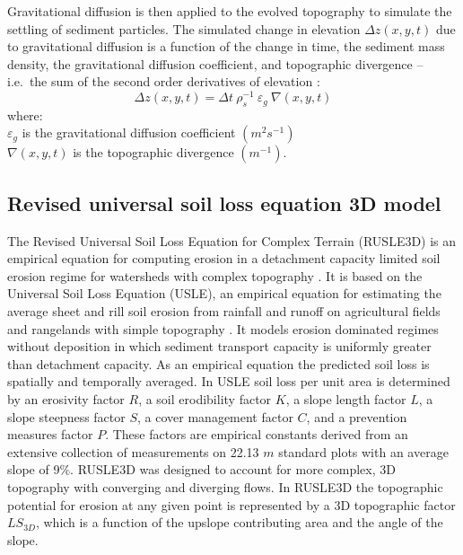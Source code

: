 \documentclass[esurf, manuscript]{copernicus}
\begin{document}
\noindent
Gravitational diffusion is then applied to the evolved topography
to simulate the settling of sediment particles. 
The simulated change in elevation $\Delta z(x,y,t) $ due to gravitational diffusion 
is a function of the change in time, the sediment mass density, 
the gravitational diffusion coefficient, and topographic divergence 
-- i.e.~the sum of the second order derivatives of elevation
\citep{thaxton2004}:
\begin{equation}
\label{eq:grav_diffusion} 
{\Delta z(x,y,t) = \Delta t ~ \rho_s^{-1} ~ \varepsilon_g ~ \nabla(x,y,t)}
\end{equation}
{\small
\noindent
where: \\
\noindent
\hspace*{0.5em} $\varepsilon_g$ is the gravitational diffusion coefficient $(m^{2} s^{-1})$\\ %
\hspace*{0.5em} $\nabla(x,y,t)$ is the topographic divergence $(m^{-1})$.\\
}

\subsection{Revised universal soil loss equation 3D model}
\label{rusle_model}
The Revised Universal Soil Loss Equation for Complex Terrain (RUSLE3D) 
is an empirical equation for computing erosion 
in a detachment capacity limited soil erosion regime
for watersheds with complex topography \citep{Mitasova1996}. 
It is based on 
the Universal Soil Loss Equation (USLE),
an empirical equation for estimating the average
sheet and rill soil erosion from rainfall and runoff
on agricultural fields and rangelands with simple topography 
\citep{Wischmeier1978}. 
It models erosion dominated regimes without deposition
in which sediment transport capacity is 
uniformly greater than detachment capacity.
As an empirical equation the predicted soil loss 
is spatially and temporally averaged. 
In USLE soil loss per unit area is determined by 
an erosivity factor $R$,
a soil erodibility factor $K$, 
a slope length factor $L$,
a slope steepness factor $S$,
a cover management factor $C$,
and a prevention measures factor $P$.
These factors are empirical constants derived 
from an extensive collection of measurements 
on 22.13 $m$ standard plots with an average slope of 9$\%$.  
RUSLE3D was designed to account for more complex, 3D topography 
with converging and diverging flows. 
In RUSLE3D the topographic potential for erosion at any given point 
is represented by a 3D topographic factor $LS_{3D}$,
which is a function of the upslope contributing area 
and the angle of the slope. 
\end{document}

